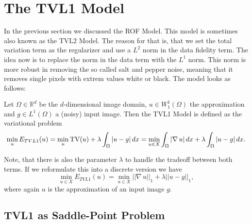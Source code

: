 \section{The TVL1 Model} %
\label{sec:the_tvl1_model}
    
    In the previous section we discussed the ROF Model. This model is sometimes also known as the TVL2 Model. The reason for that is, that we set the total variation term as the regularizer and use a $L^{2}$ norm in the data fidelity term. The idea now is to replace the norm in the data term with the $L^{1}$ norm. This norm is more robust in removing the so called salt and pepper noise, meaning that it removes single pixels with extrem values white or black. The model looks as follows:

    \begin{definition} %
    \label{def:the_tvl1_model}

        Let $\Omega \in \mathbb{R}^{d}$ be the $d$-dimensional image domain, $u \in W_{1}^{1}(\Omega)$ the approximation and $g \in L^{1}(\Omega)$ a (noisy) input image. Then the TVL1 Model is defined as the variational problem
            \begin{equation}
                \min_{u} E_{TVL1}(u) = \min_{u} \textnormal{TV}(u) + \lambda \int_{\Omega} |u - g| \, dx = \min_{u \in X} \int_{\Omega} |\nabla \, u| \, dx + \lambda \int_{\Omega} |u - g| \, dx.
                \label{eq:the_tvl1_model}
            \end{equation}

    \end{definition}

    Note, that there is also the parameter $\lambda$ to handle the tradeoff between both terms. If we reformulate this into a discrete version we have
        \begin{equation}
            \min_{u \in X} E_{TVL1}(u) = \min_{u \in X} ||\nabla \, u||_{1} + \lambda ||u - g||_{1},
        \label{eq:discrete_tvl1_model}
        \end{equation}
    where again $u$ is the approximation of an input image $g$.

    \subsection{TVL1 as Saddle-Point Problem} %
    \label{sub:tvl1_as_saddle_point_problem}

